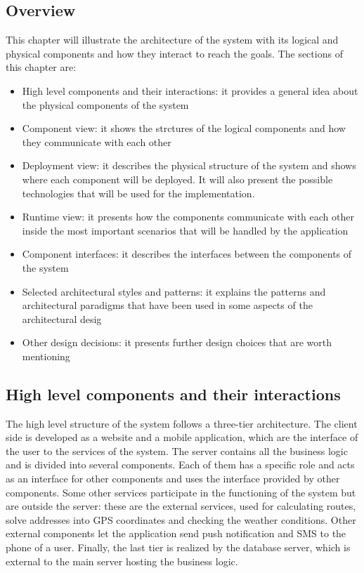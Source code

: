 
\subsection{Overview}

This chapter will illustrate the architecture of the system with its logical and physical components and how they interact to reach the goals. The sections of this chapter are:
\begin{itemize}
	\item High level components and their interactions: it provides a general idea about the physical components of the system
	\item Component view: it shows the strctures of the logical components and how they communicate with each other
	\item Deployment view: it describes the physical structure of the system and shows where each component will be deployed. It will also present the possible technologies that will be used for the implementation.
	\item Runtime view: it presents how the components communicate with each other inside the most important scenarios that will be handled by the application
	\item Component interfaces: it describes the interfaces between the components of the system
	\item Selected architectural styles and patterns: it explains the patterns and architectural paradigms that have been used in some aspects of the architectural desig
	\item Other design decisions: it presents further design choices that are worth mentioning
\end{itemize}

\subsection{High level components and their interactions}

The high level structure of the system follows a three-tier architecture. The client side is developed as a website and a mobile application, which are the interface of the user to the services of the system. The server contains all the business logic and is divided into several components. Each of them has a specific role and acts as an interface for other components and uses the interface provided by other components. Some other services participate in the functioning of the system but are outside the server: these are the external services, used for calculating routes, solve addresses into GPS coordinates and checking the weather conditions. Other external components let the application send push notification and SMS to the phone of a user. Finally, the last tier is realized by the database server, which is external to the main server hosting the business logic.

